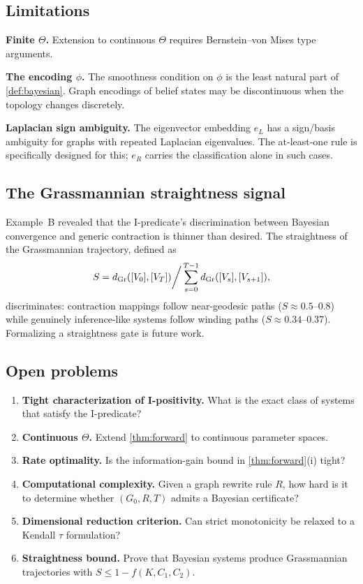 \documentclass{../shared/primo}
\begin{document}
\subsection{Limitations}

\textbf{Finite $\Theta$.} Extension to continuous $\Theta$ requires Bernstein--von Mises type arguments.

\textbf{The encoding $\phi$.} The smoothness condition on $\phi$ is the least natural part of \cref{def:bayesian}. Graph encodings of belief states may be discontinuous when the topology changes discretely.

\textbf{Laplacian sign ambiguity.} The eigenvector embedding $e_L$ has a sign/basis ambiguity for graphs with repeated Laplacian eigenvalues. The at-least-one rule is specifically designed for this; $e_R$ carries the classification alone in such cases.

\subsection{The Grassmannian straightness signal}

Example~B revealed that the I-predicate's discrimination between Bayesian convergence and generic contraction is thinner than desired. The straightness of the Grassmannian trajectory, defined as
\[
S = d_{\mathrm{Gr}}([V_0], [V_T]) \bigg/ \sum_{s=0}^{T-1} d_{\mathrm{Gr}}([V_s], [V_{s+1}]),
\]
discriminates: contraction mappings follow near-geodesic paths ($S \approx 0.5\text{--}0.8$) while genuinely inference-like systems follow winding paths ($S \approx 0.34\text{--}0.37$). Formalizing a straightness gate is future work.

\subsection{Open problems}

\begin{enumerate}
\item \textbf{Tight characterization of I-positivity.} What is the exact class of systems that satisfy the I-predicate?
\item \textbf{Continuous $\Theta$.} Extend \cref{thm:forward} to continuous parameter spaces.
\item \textbf{Rate optimality.} Is the information-gain bound in \cref{thm:forward}(i) tight?
\item \textbf{Computational complexity.} Given a graph rewrite rule $R$, how hard is it to determine whether $(G_0, R, T)$ admits a Bayesian certificate?
\item \textbf{Dimensional reduction criterion.} Can strict monotonicity be relaxed to a Kendall $\tau$ formulation?
\item \textbf{Straightness bound.} Prove that Bayesian systems produce Grassmannian trajectories with $S \leq 1 - f(K, C_1, C_2)$.
\end{enumerate}
\end{document}
